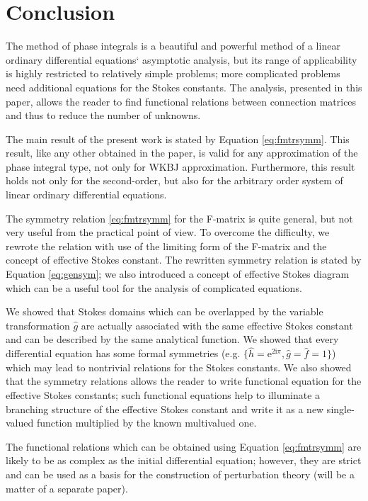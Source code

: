 \documentclass[atmp]{ipart_v1}
\def\rme{\mathrm{e}}
\def\rmi{\mathrm{i}}
\def\f{\hat{f}}
\def\g{\hat{g}}
\def\h{\hat{h}}
\def\unity{1}
\newcommand\eref[1]{\eqref{#1}}
\newcommand\Eref[1]{Equation \ref{#1}}
\begin{document}
 

\section{Conclusion \label{sec:cnclsns}}

The method of phase integrals is a beautiful and powerful method of a linear ordinary 
differential equations` asymptotic analysis, but its range of applicability is highly 
restricted to relatively simple problems; more complicated problems need additional equations 
for the Stokes constants. The analysis, presented in this paper, allows the reader to find 
functional relations between connection matrices and thus to reduce the number of unknowns.

The main result of the present work is stated by \Eref{eq:fmtrsymm}. This result, 
like any other obtained in the paper, is valid for any approximation of the 
phase integral type, not only for WKBJ approximation. Furthermore, this result 
holds not only for the second-order, but also for the arbitrary order system 
of linear ordinary differential equations. 

The symmetry relation \eref{eq:fmtrsymm} for the F-matrix is quite general, but not very useful 
from the practical point of view. To overcome the difficulty, we rewrote the relation with use of 
the limiting form of the F-matrix and the concept of effective Stokes constant. The rewritten
symmetry relation is stated by \Eref{eq:gensym}; we also introduced a concept of effective Stokes diagram
which can be a useful tool for the analysis of complicated equations. 

We showed that Stokes domains which can be overlapped by the variable transformation $\g$ are actually 
associated with the same effective Stokes constant and can be described by the same analytical function. 
We showed that every differential equation has some formal symmetries (e.g. $\{\h=\rme^{2\rmi\pi},\g=\f=\unity\}$) 
which may lead to nontrivial relations for the Stokes constants. We also showed that the symmetry relations allows the 
reader to write functional equation for the effective Stokes constants; such functional equations
help to illuminate a branching structure of the effective Stokes constant and write it as a new single-valued 
function multiplied by the known multivalued one.

The functional relations which can be obtained using \Eref{eq:fmtrsymm} are likely to be as 
complex as the initial differential equation; however, they are strict and can be used as 
a basis for the construction of perturbation theory (will be a matter of a separate paper).
\end{document}
